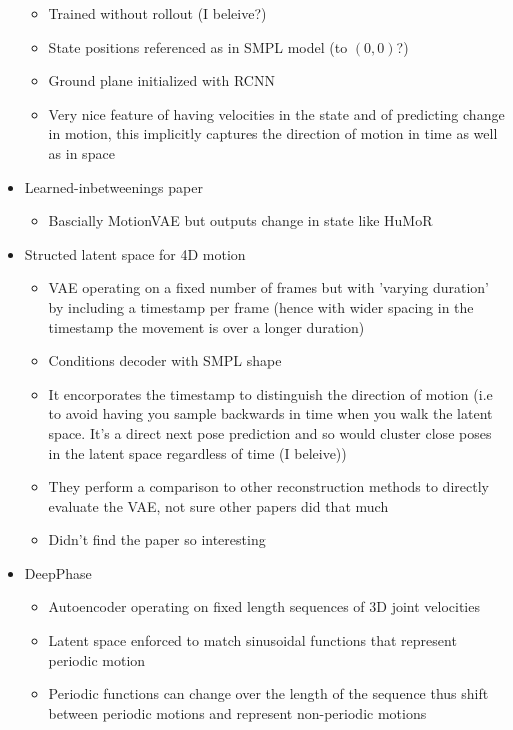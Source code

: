 \begin{itemize}
\begin{itemize}
        \item Trained without rollout (I beleive?) 
        \item State positions referenced as in SMPL model (to $(0,0)$?)
        \item Ground plane initialized with RCNN
        \item Very nice feature of having velocities in the state and of predicting change in motion, this implicitly captures the direction of motion in time as well as in space 
    \end{itemize}
    \item Learned-inbetweenings paper \cite{learnedInbetweening}
    \begin{itemize}
        \item Bascially MotionVAE but outputs change in state like HuMoR
    \end{itemize}
    \item Structed latent space for 4D motion \cite{structured4Dlatentspace}
    \begin{itemize}
        \item VAE operating on a fixed number of frames but with 'varying duration' by including a timestamp per frame (hence with wider spacing in the timestamp the movement is over a longer duration)
        \item Conditions decoder with SMPL shape
        \item It encorporates the timestamp to distinguish the direction of motion (i.e to avoid having you sample backwards in time when you walk the latent space. It's a direct next pose prediction and so would cluster close poses in the latent space regardless of time (I beleive))
        \item They perform a comparison to other reconstruction methods to directly evaluate the VAE, not sure other papers did that much
        \item Didn't find the paper so interesting
    \end{itemize}
    \item DeepPhase \cite{DeepPhase}
    \begin{itemize}
        \item Autoencoder operating on fixed length sequences of 3D joint velocities
        \item Latent space enforced to match sinusoidal functions that represent periodic motion
        \item Periodic functions can change over the length of the sequence thus shift between periodic motions and represent non-periodic motions

\end{itemize}
\end{itemize}
